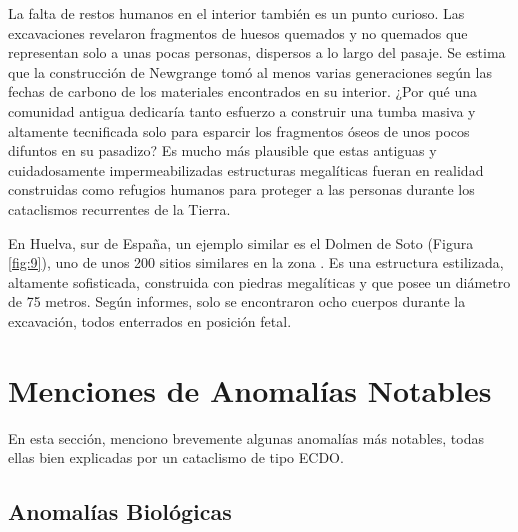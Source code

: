 \documentclass[10pt,twocolumn,letterpaper]{article}
\begin{document}
La falta de restos humanos en el interior también es un punto curioso. Las excavaciones revelaron fragmentos de huesos quemados y no quemados que representan solo a unas pocas personas, dispersos a lo largo del pasaje. Se estima que la construcción de Newgrange tomó al menos varias generaciones según las fechas de carbono de los materiales encontrados en su interior. ¿Por qué una comunidad antigua dedicaría tanto esfuerzo a construir una tumba masiva y altamente tecnificada solo para esparcir los fragmentos óseos de unos pocos difuntos en su pasadizo? Es mucho más plausible que estas antiguas y cuidadosamente impermeabilizadas estructuras megalíticas fueran en realidad construidas como refugios humanos para proteger a las personas durante los cataclismos recurrentes de la Tierra.

En Huelva, sur de España, un ejemplo similar es el Dolmen de Soto (Figura \ref{fig:9}), uno de unos 200 sitios similares en la zona \cite{72,32}. Es una estructura estilizada, altamente sofisticada, construida con piedras megalíticas y que posee un diámetro de 75 metros. Según informes, solo se encontraron ocho cuerpos durante la excavación, todos enterrados en posición fetal.

\section{Menciones de Anomalías Notables}

En esta sección, menciono brevemente algunas anomalías más notables, todas ellas bien explicadas por un cataclismo de tipo ECDO.

\subsection{Anomalías Biológicas}
\end{document}
